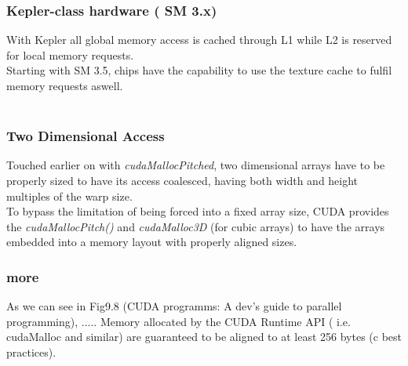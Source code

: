 \subsubsection{Kepler-class hardware ( SM 3.x)}
With Kepler all global memory access is cached through L1 while L2 is reserved for local memory requests.\\
Starting with SM 3.5, chips have the capability to use the texture cache to fulfil memory requests aswell.\\
\\
\subsubsection{Two Dimensional Access}
Touched earlier on with \emph{cudaMallocPitched}, two dimensional arrays have to be properly sized to have its access coalesced, having both width and height multiples of the warp size.\\
To bypass the limitation of being forced into a fixed array size, CUDA provides the \emph{cudaMallocPitch()} and \emph{cudaMalloc3D} (for cubic arrays) to have the arrays embedded into a memory layout with properly aligned sizes.
\subsubsection{more}
As we can see in Fig9.8 (CUDA programms: A dev's guide to parallel programming), .....
Memory allocated by the CUDA Runtime API ( i.e. cudaMalloc and similar) are guaranteed to be aligned to at least 256 bytes (c best practices).\\
